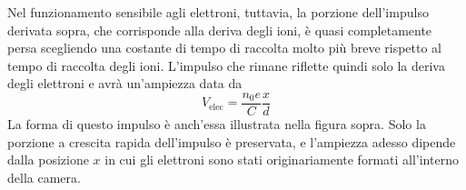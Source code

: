 \begin{approfondimento}
   Nel funzionamento sensibile agli elettroni, tuttavia, la porzione dell'impulso derivata sopra, che corrisponde alla deriva degli ioni, è quasi completamente persa scegliendo una costante di tempo di raccolta molto più breve rispetto al tempo di raccolta degli ioni. L'impulso che rimane riflette quindi solo la deriva degli elettroni e avrà un'ampiezza data da
   \begin{equation*}
      V_{\text{elec}}=\frac{n_0 e}{C} \frac{x}{d}
   \end{equation*}
   La forma di questo impulso è anch'essa illustrata nella figura sopra. Solo la porzione a crescita rapida dell'impulso è preservata, e l'ampiezza adesso dipende dalla posizione $x$ in cui gli elettroni sono stati originariamente formati all'interno della camera.
\end{approfondimento}

